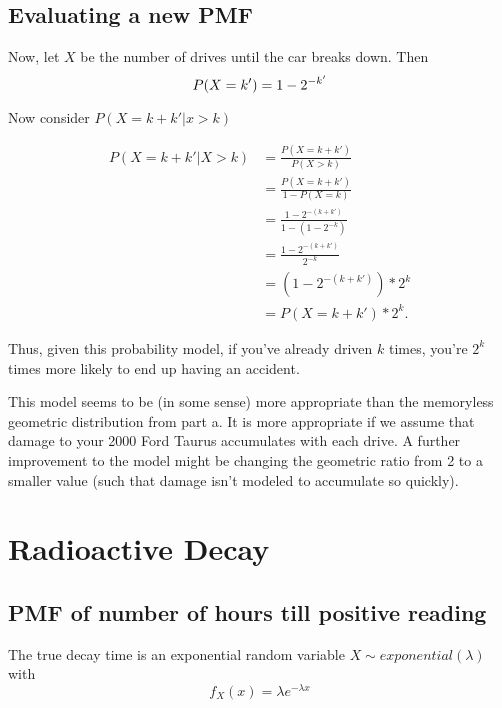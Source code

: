 \documentclass[paper=a4, fontsize=11pt]{scrartcl} %
\numberwithin{equation}{section} %
\numberwithin{figure}{section} %
\numberwithin{table}{section} %
\begin{document}
\subsection{Evaluating a new PMF}

Now, let $X$ be the number of drives until the car breaks down. Then
\begin{equation*}
P(X = k') = 1 - 2^{-k'} \\
\end{equation*}

Now consider $P(X = k + k' | x >k)$

\begin{align*}
P(X = k+ k' | X > k)& = \frac{P(X = k + k')}{P(X > k)}\\
   & = \frac{P(X = k + k')}{1- P(X = k)}\\
   & = \frac{1 - 2^{-(k+k')}}{1-(1-2^{-k})}\\
   & = \frac{1 - 2^{-(k+k')}}{2^{-k}}\\
   & = (1 - 2^{-(k+k')})*2^{k}\\
   & = P(X = k + k') * 2^k.
\end{align*}

Thus, given this probability model, if you've already driven $k$ times, you're $2^k$ times more likely to end up having an accident.

This model seems to be (in some sense) more appropriate than the memoryless geometric distribution from part a. It is more appropriate if we assume that damage to your 2000 Ford Taurus accumulates with each drive. A further improvement to the model might be changing the geometric ratio from 2 to a smaller value (such that damage isn't modeled to accumulate so quickly).
\section{Radioactive Decay}

\subsection{PMF of number of hours till positive reading}

The true decay time is an exponential random variable $X \sim exponential(\lambda)$ with
\begin{equation*}
f_X(x)=\lambda e^{-\lambda x}
\end{equation*}
\end{document}
